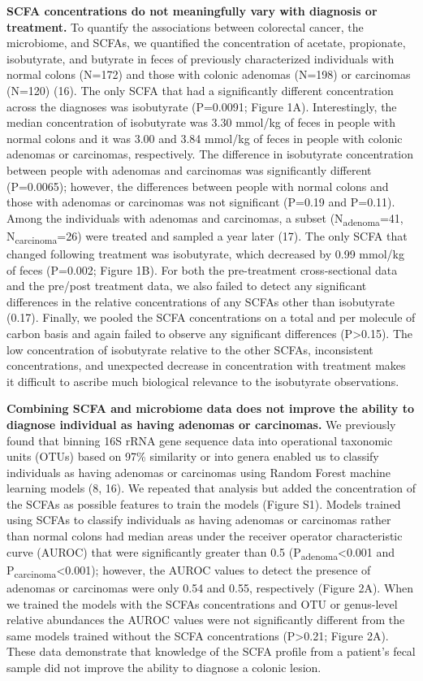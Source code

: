 \documentclass[11pt,]{article}
\begin{document}
\textbf{SCFA concentrations do not meaningfully vary with diagnosis or
treatment.} To quantify the associations between colorectal cancer, the
microbiome, and SCFAs, we quantified the concentration of acetate,
propionate, isobutyrate, and butyrate in feces of previously
characterized individuals with normal colons (N=172) and those with
colonic adenomas (N=198) or carcinomas (N=120) (16). The only SCFA that
had a significantly different concentration across the diagnoses was
isobutyrate (P=0.0091; Figure 1A). Interestingly, the median
concentration of isobutyrate was 3.30 mmol/kg of feces in people with
normal colons and it was 3.00 and 3.84 mmol/kg of feces in people with
colonic adenomas or carcinomas, respectively. The difference in
isobutyrate concentration between people with adenomas and carcinomas
was significantly different (P=0.0065); however, the differences between
people with normal colons and those with adenomas or carcinomas was not
significant (P=0.19 and P=0.11). Among the individuals with adenomas and
carcinomas, a subset (N\textsubscript{adenoma}=41,
N\textsubscript{carcinoma}=26) were treated and sampled a year later
(17). The only SCFA that changed following treatment was isobutyrate,
which decreased by 0.99 mmol/kg of feces (P=0.002; Figure 1B). For both
the pre-treatment cross-sectional data and the pre/post treatment data,
we also failed to detect any significant differences in the relative
concentrations of any SCFAs other than isobutyrate (0.17). Finally, we
pooled the SCFA concentrations on a total and per molecule of carbon
basis and again failed to observe any significant differences
(P\textgreater{}0.15). The low concentration of isobutyrate relative to
the other SCFAs, inconsistent concentrations, and unexpected decrease in
concentration with treatment makes it difficult to ascribe much
biological relevance to the isobutyrate observations.

\textbf{Combining SCFA and microbiome data does not improve the ability
to diagnose individual as having adenomas or carcinomas.} We previously
found that binning 16S rRNA gene sequence data into operational
taxonomic units (OTUs) based on 97\% similarity or into genera enabled
us to classify individuals as having adenomas or carcinomas using Random
Forest machine learning models (8, 16). We repeated that analysis but
added the concentration of the SCFAs as possible features to train the
models (Figure S1). Models trained using SCFAs to classify individuals
as having adenomas or carcinomas rather than normal colons had median
areas under the receiver operator characteristic curve (AUROC) that were
significantly greater than 0.5 (P\textsubscript{adenoma}\textless{}0.001
and P\textsubscript{carcinoma}\textless{}0.001); however, the AUROC
values to detect the presence of adenomas or carcinomas were only 0.54
and 0.55, respectively (Figure 2A). When we trained the models with the
SCFAs concentrations and OTU or genus-level relative abundances the
AUROC values were not significantly different from the same models
trained without the SCFA concentrations (P\textgreater{}0.21; Figure
2A). These data demonstrate that knowledge of the SCFA profile from a
patient's fecal sample did not improve the ability to diagnose a colonic
lesion.
\end{document}
